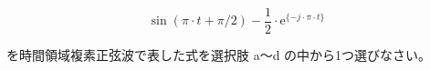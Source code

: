 \[
\sin (\pi \cdot t+\pi/2) - \frac{1}{2} \cdot \textrm{e}^{\{-j \cdot \pi \cdot t \}}
\]

\bigskip
\noindent を時間領域複素正弦波で表した式を選択肢 a〜d の中から1つ選びなさい。
